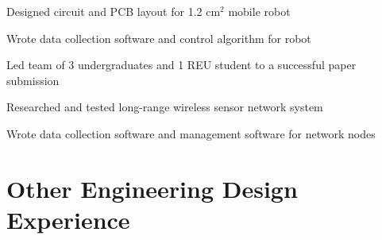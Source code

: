 \documentclass[letterpaper]{deedy-resume} %
\begin{document}
\begin{minipage}[t]{1\textwidth}
\sectionspace %



\begin{tightitemize}
\item Designed circuit and PCB layout for 1.2 cm$^2$ mobile robot
\item Wrote data collection software and control algorithm for robot
\item Led team of 3 undergraduates and 1 REU student to a successful paper submission
\end{tightitemize}

\sectionspace %



\begin{tightitemize}
\item Researched and tested long-range wireless sensor network system
\item Wrote data collection software and management software for network nodes
\end{tightitemize}

\sectionspace


\section{Other Engineering Design Experience}

\vspace{0.4cm}



\vspace{\topsep} %
\begin{tightitemize}


\end{tightitemize}
\end{minipage}
\end{document}
